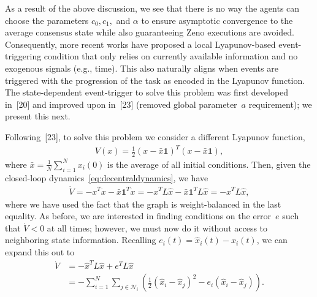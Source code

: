 \documentclass[]{book}
\newcommand{\NN}{{\mathcal{N}}}
\begin{document}
As a result of the above discussion, we see that there is no way the
agents can choose the parameters $c_0, c_1,$ and $\alpha$ to ensure
asymptotic convergence to the average consensus state while also
guaranteeing Zeno executions are avoided. Consequently, more recent
works have proposed a local Lyapunov-based event-triggering condition
that only relies on currently available information and no exogenous
signals (e.g., time). This also naturally aligns when events are
triggered with the progression of the task as encoded in the Lyapunov
function. The state-dependent event-trigger to solve this problem was
first developed in~[20] and improved upon
in~[23] (removed global parameter~$a$ requirement); we
present this next.

Following~[23], to solve this problem we consider a
different Lyapunov function,
\begin{align*}
  V(x) = \frac{1}{2} (x - \bar{x} \mathbf{1})^T (x - \bar{x}
  \mathbf{1}) ,
\end{align*}
where $\bar{x} = \frac{1}{N} \sum_{i=1}^N x_i(0)$ is the average of
all initial conditions.  Then, given the closed-loop
dynamics~\eqref{eq:decentraldynamics}, we have
\begin{align*}
  \dot{V} = - x^T \dot{x} - \bar{x} \mathbf{1}^T \dot{x} = - x^T L
  \hat{x} - \bar{x} \mathbf{1}^T L \hat{x} = - x^T L \hat{x},
\end{align*}
where we have used the fact that the graph is weight-balanced in the
last equality.  As before, we are interested in finding conditions on
the error~$e$ such that $\dot{V} < 0$ at all times; however, we must
now do it without access to neighboring state information. Recalling
$e_i(t) = \hat{x}_i(t) - x_i(t)$, we can expand this out to
\begin{align*}
  \dot{V} &= -\hat{x}^T L \hat{x} + e^T L \hat{x} \\
  &= -\sum_{i=1}^N \sum_{j \in \NN_i} \left( \frac{1}{2} (\hat{x}_i -
    \hat{x}_j)^2 - e_i (\hat{x}_i-\hat{x}_j) \right) .
\end{align*}

\end{document}
